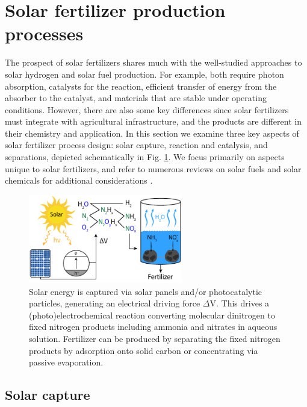 \section{Solar fertilizer production processes}
\label{sec:approaches}

The prospect of solar fertilizers shares much with the well-studied approaches to solar hydrogen and solar fuel production. For example, both require photon absorption, catalysts for the reaction, efficient transfer of energy from the absorber to the catalyst, and materials that are stable under operating conditions. However, there are also some key differences since solar fertilizers must integrate with agricultural infrastructure, and the products are different in their chemistry and application. In this section we examine three key aspects of solar fertilizer process design: solar capture, reaction and catalysis, and separations, depicted schematically in Fig. \ref{fig:capture_reaction_separation}. We focus primarily on aspects unique to solar fertilizers, and refer to numerous reviews on solar fuels and solar chemicals for additional considerations \cite{McDaniel_2010,Pinaud_2013,Highfield_2015, Shaner_2016, Montoya_2017}. 

\begin{figure}
    \centering
    \includegraphics[width=0.6\textwidth]{Figures/capture_reaction_separation.pdf}
    \caption{Solar energy is captured via solar panels and/or photocatalytic particles, generating an electrical driving force $\Delta$V. This drives a (photo)electrochemical reaction converting molecular dinitrogen to fixed nitrogen products including ammonia and nitrates in aqueous solution. Fertilizer can be produced by separating the fixed nitrogen products by adsorption onto solid carbon or concentrating via passive evaporation.}
    \label{fig:capture_reaction_separation}
\end{figure}

\subsection{Solar capture}
\label{sec:solarcapture}


